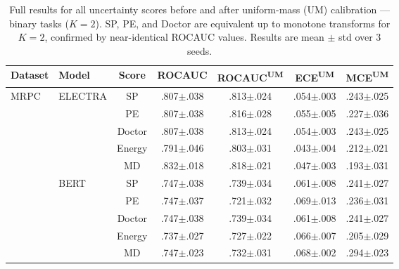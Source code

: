 
\begin{table}[h]
\centering
\caption{Full results for all uncertainty scores before and after uniform-mass (UM) calibration --- binary tasks ($K{=}2$).
SP, PE, and Doctor are equivalent up to monotone transforms for $K{=}2$, confirmed by near-identical ROCAUC values.
Results are mean $\pm$ std over 3 seeds.}
\label{tab:full_results}
\footnotesize
\setlength{\tabcolsep}{4pt}
\begin{tabular}{@{}llccccc@{}}
\toprule
\textbf{Dataset} & \textbf{Model} & \textbf{Score} & \textbf{ROCAUC} & \textbf{ROCAUC\textsuperscript{UM}} & \textbf{ECE\textsuperscript{UM}} & \textbf{MCE\textsuperscript{UM}} \\
\midrule
MRPC & ELECTRA & SP & .807{\scriptsize$\pm$.038} & .813{\scriptsize$\pm$.024} & .054{\scriptsize$\pm$.003} & .243{\scriptsize$\pm$.025} \\
 &  & PE & .807{\scriptsize$\pm$.038} & .816{\scriptsize$\pm$.028} & .055{\scriptsize$\pm$.005} & .227{\scriptsize$\pm$.036} \\
 &  & Doctor & .807{\scriptsize$\pm$.038} & .813{\scriptsize$\pm$.024} & .054{\scriptsize$\pm$.003} & .243{\scriptsize$\pm$.025} \\
 &  & Energy & .791{\scriptsize$\pm$.046} & .803{\scriptsize$\pm$.031} & .043{\scriptsize$\pm$.004} & .212{\scriptsize$\pm$.021} \\
 &  & MD & .832{\scriptsize$\pm$.018} & .818{\scriptsize$\pm$.021} & .047{\scriptsize$\pm$.003} & .193{\scriptsize$\pm$.031} \\
\cmidrule(l){2-7}
 & BERT & SP & .747{\scriptsize$\pm$.038} & .739{\scriptsize$\pm$.034} & .061{\scriptsize$\pm$.008} & .241{\scriptsize$\pm$.027} \\
 &  & PE & .747{\scriptsize$\pm$.037} & .721{\scriptsize$\pm$.032} & .069{\scriptsize$\pm$.013} & .236{\scriptsize$\pm$.031} \\
 &  & Doctor & .747{\scriptsize$\pm$.038} & .739{\scriptsize$\pm$.034} & .061{\scriptsize$\pm$.008} & .241{\scriptsize$\pm$.027} \\
 &  & Energy & .737{\scriptsize$\pm$.027} & .727{\scriptsize$\pm$.022} & .066{\scriptsize$\pm$.007} & .205{\scriptsize$\pm$.029} \\
 &  & MD & .747{\scriptsize$\pm$.023} & .732{\scriptsize$\pm$.031} & .068{\scriptsize$\pm$.002} & .294{\scriptsize$\pm$.023} \\

\end{tabular}
\end{table}
